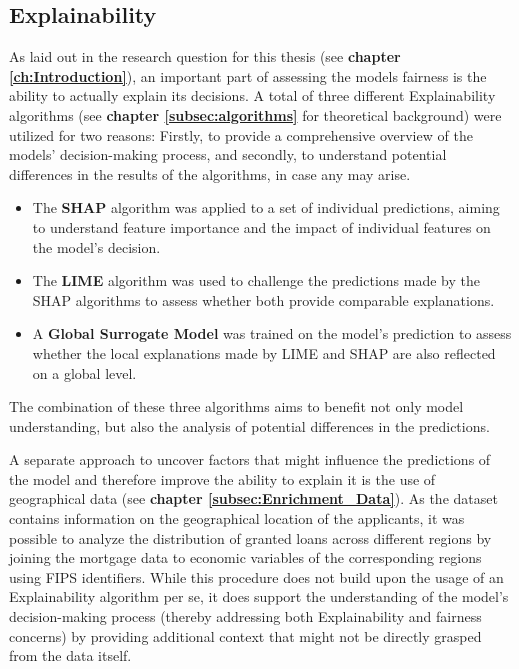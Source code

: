 \subsection{Explainability}\label{subsec:Explainability}

As laid out in the research question for this thesis (see \textbf{chapter \ref{ch:Introduction}}), an important part of assessing the models fairness is the ability to actually explain its decisions.
A total of three different Explainability algorithms (see \textbf{chapter \ref{subsec:algorithms}} for theoretical background) were utilized for two reasons: Firstly, to provide a comprehensive overview of the models' decision-making process, and secondly, to understand potential differences in the results of the algorithms, in case any may arise.
\begin{itemize}
    \item The \textbf{SHAP} algorithm was applied to a set of individual predictions, aiming to understand feature importance and the impact of individual features on the model's decision.
    \item The \textbf{LIME} algorithm was used to challenge the predictions made by the SHAP algorithms to assess whether both provide comparable explanations.
    \item A \textbf{Global Surrogate Model} was trained on the model's prediction to assess whether the local explanations made by LIME and SHAP are also reflected on a global level.
\end{itemize}
The combination of these three algorithms aims to benefit not only model understanding, but also the analysis of potential differences in the predictions.

A separate approach to uncover factors that might influence the predictions of the model and therefore improve the ability to explain it is the use of geographical data (see \textbf{chapter \ref{subsec:Enrichment_Data}}). As the dataset contains information on the geographical location of the applicants, it was possible to analyze the distribution of granted loans across different regions by joining the mortgage data to economic variables of the corresponding regions using FIPS identifiers. 
While this procedure does not build upon the usage of an Explainability algorithm per se, it does support the understanding of the model's decision-making process (thereby addressing both Explainability and fairness concerns) by providing additional context that might not be directly grasped from the data itself.

